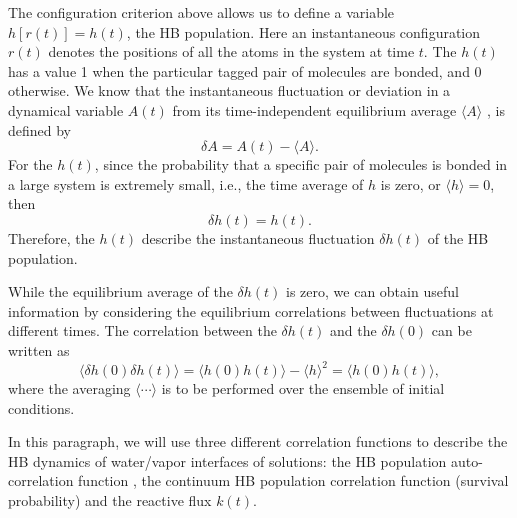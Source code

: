 The configuration criterion above allows us to define a variable $h[r(t)] = h(t)$, the HB population. 
Here an instantaneous configuration $r(t)$ denotes the positions of all the atoms in the system at time $t$.\cite{AL96}  
The $h(t)$ has a value 1 when the particular tagged pair of molecules are bonded, and 0 otherwise. 
We know that the instantaneous fluctuation or deviation in a dynamical variable $A(t)$ from its time-independent equilibrium average $\langle A\rangle$ , 
is defined by \cite{DC87} 
$$
\delta A = A(t) - \langle A\rangle.
$$
For the $h(t)$, since the probability that a specific pair of molecules is bonded in a large system is extremely small, i.e., 
the time average of $h$ is zero, or  
$\langle h \rangle = 0$,
then
$$
\delta h(t) = h(t).
$$
Therefore, the $h(t)$ describe the instantaneous fluctuation $\delta h(t)$  of the HB population.  

While the equilibrium average of the $\delta h(t)$ is zero, we can obtain useful information by considering the equilibrium 
correlations between fluctuations at different times. The correlation between the $\delta h(t)$ and the $\delta h(0)$ can be written as 
$$
\langle \delta h(0) \delta h(t)\rangle = \langle h(0)h(t)\rangle-\langle h \rangle^2 = \langle h(0)h(t)\rangle,
$$
where the averaging $\langle\cdots\rangle$ is to be performed over the ensemble of initial conditions.%


In this paragraph, we will use three different correlation functions to describe the HB dynamics of water/vapor interfaces of solutions:
the HB population auto-correlation function \CHB, the continuum HB population correlation function (survival probability) \SHB and the reactive flux $k(t)$. \cite{Rapaport1983}

%

